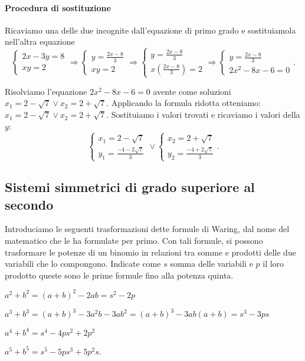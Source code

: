 \begin{esempio}{}{}
\paragraph{Procedura di sostituzione}
Ricaviamo una delle due incognite dall'equazione di primo grado e sostituiamola 
nell'altra equazione \[ \left\{\begin{array}{l}{2x-3y=8} 
\\{{xy}=2}\end{array}\right.\Rightarrow\left\{\begin{array}{l}{y=\frac{2x-8} 
3}\\{{xy}=2}\end{array}\right.\Rightarrow \left\{\begin{array}{l}{y=\frac{2x-8} 
3}\\{x\left(\frac{2x-8} 3\right)=2}\end{array}\right.\Rightarrow 
\left\{\begin{array}{l}{y=\frac{2x-8} 3}\\{2x^2-8x-6=0}\end{array}\right.. \]

Risolviamo l'equazione \(2x^2-8x-6=0\) avente come soluzioni \(x_1=2-\sqrt 7\vee 
x_2=2+\sqrt 7\). Applicando la formula ridotta otteniamo: \(x_1=2-\sqrt 7\vee 
x_2=2+\sqrt 7\).
Sostituiamo i valori trovati e ricaviamo i valori della \(y\): \[ 
\left\{\begin{array}{l}{x_1=2-\sqrt 7}\\{y_1=\frac{-4-2\sqrt 7} 
3}\end{array}\right.\vee \left\{\begin{array}{l}{x_2=2+\sqrt 
7}\\{y_2=\frac{-4+2\sqrt 7} 3}\end{array}\right.. \]
\end{esempio}


\subsection{Sistemi simmetrici di grado superiore al secondo}
Introduciamo le seguenti trasformazioni dette formule di Waring, dal nome del 
matematico che le ha formulate per primo. Con tali formule, si possono 
trasformare le potenze di un binomio in relazioni tra somme e prodotti delle due 
variabili che lo compongono. Indicate come \(s\) somma delle variabili e \(p\) 
il loro prodotto queste sono le prime formule fino alla potenza quinta.
\begin{itemize*}
\item \( a^2+b^2=(a+b)^2-2{ab}=s^2-2p \)
\item \( a^3+b^3=(a+b)^3-3a^2b-3ab^2=(a+b)^3-3{ab}(a+b)=s^3-3{ps} \)
\item \( a^4+b^4=s^4-4{ps}^2+2p^2 \)
\item \( a^5+b^5=s^5-5{ps}^3+5p^2s \).
\end{itemize*}

